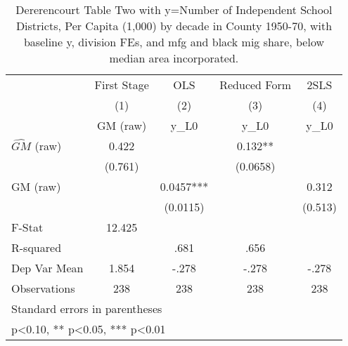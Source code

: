 \begin{table}[htbp]\centering
\def\sym#1{\ifmmode^{#1}\else\(^{#1}\)\fi}
\caption{Dererencourt Table Two with y=Number of Independent School Districts, Per Capita (1,000) by decade in County 1950-70, with baseline y, division FEs, and mfg and black mig share, below median area incorporated.}
\begin{tabular}{l*{4}{c}}
\toprule
                    & First Stage   &         OLS   &Reduced Form   &        2SLS   \\
                    &\multicolumn{1}{c}{(1)}&\multicolumn{1}{c}{(2)}&\multicolumn{1}{c}{(3)}&\multicolumn{1}{c}{(4)}\\
                    &\multicolumn{1}{c}{GM  (raw)}&\multicolumn{1}{c}{y\_L0}&\multicolumn{1}{c}{y\_L0}&\multicolumn{1}{c}{y\_L0}\\
\midrule
$\hat{GM}$ (raw)    &       0.422   &               &       0.132** &               \\
                    &     (0.761)   &               &    (0.0658)   &               \\
\addlinespace
GM  (raw)           &               &      0.0457***&               &       0.312   \\
                    &               &    (0.0115)   &               &     (0.513)   \\
\midrule
F-Stat              &      12.425   &               &               &               \\
R-squared           &               &        .681   &        .656   &               \\
Dep Var Mean        &       1.854   &       -.278   &       -.278   &       -.278   \\
Observations        &         238   &         238   &         238   &         238   \\
\bottomrule
\multicolumn{5}{l}{\footnotesize Standard errors in parentheses}\\
\multicolumn{5}{l}{\footnotesize * p<0.10, ** p<0.05, *** p<0.01}\\
\end{tabular}
\end{table}
